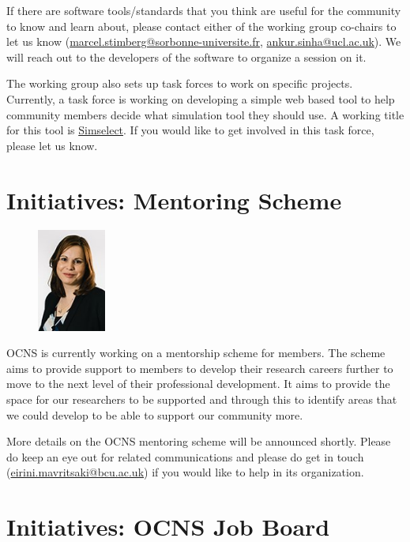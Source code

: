 \documentclass[11pt,a4paper,oneside]{article}
\begin{document}
If there are software tools/standards that you think are useful for the community to know and learn about, please contact either of the working group co-chairs to let us know (\href{mailto:marcel.stimberg@sorbonne-universite.fr}{marcel.stimberg@sorbonne-universite.fr}, \href{mailto:ankur.sinha@ucl.ac.uk}{ankur.sinha@ucl.ac.uk}).
We will reach out to the developers of the software to organize a session on it.

The working group also sets up task forces to work on specific projects.
Currently, a task force is working on developing a simple web based tool to help community members decide what simulation tool they should use.
A working title for this tool is \href{https://github.com/OCNS/simselect/issues}{Simselect}. 
If you would like to get involved in this task force, please let us know.

\section*{Initiatives: Mentoring Scheme}%
\begin{figure}
  \includegraphics[width=0.2\textwidth]{images/Mavritsaki}
\end{figure}

OCNS is currently working on a mentorship scheme for members.
The scheme aims to provide support to members to develop their research careers further to move to the next level of their professional development.
It aims to provide the space for our researchers to be supported and through this to identify areas that we could develop to be able to support our community more.

More details on the OCNS mentoring scheme will be announced shortly.
Please do keep an eye out for related communications and please do get in touch (\href{mailto:eirini.mavritsaki@bcu.ac.uk}{eirini.mavritsaki@bcu.ac.uk}) if you would like to help in its organization.

\vspace{7ex}
\section*{Initiatives: OCNS Job Board}%
\sectionauthor{\vspace{-4ex}}
\end{document}
